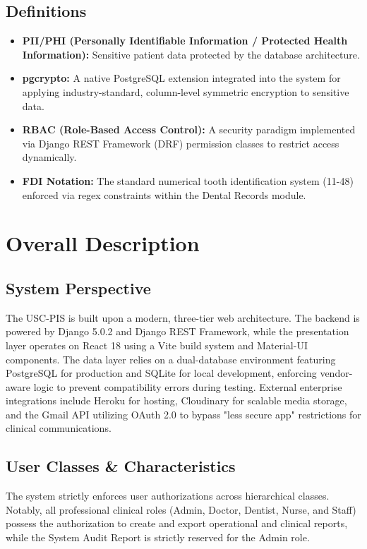 \subsection{Definitions}
\begin{itemize}
    \item \textbf{PII/PHI (Personally Identifiable Information / Protected Health Information):} Sensitive patient data protected by the database architecture.
    \item \textbf{pgcrypto:} A native PostgreSQL extension integrated into the system for applying industry-standard, column-level symmetric encryption to sensitive data.
    \item \textbf{RBAC (Role-Based Access Control):} A security paradigm implemented via Django REST Framework (DRF) permission classes to restrict access dynamically.
    \item \textbf{FDI Notation:} The standard numerical tooth identification system (11-48) enforced via regex constraints within the Dental Records module.
\end{itemize}

\section{Overall Description}

\subsection{System Perspective}
The USC-PIS is built upon a modern, three-tier web architecture. The backend is powered by Django 5.0.2 and Django REST Framework, while the presentation layer operates on React 18 using a Vite build system and Material-UI components. The data layer relies on a dual-database environment featuring PostgreSQL for production and SQLite for local development, enforcing vendor-aware logic to prevent compatibility errors during testing. External enterprise integrations include Heroku for hosting, Cloudinary for scalable media storage, and the Gmail API utilizing OAuth 2.0 to bypass "less secure app" restrictions for clinical communications.

\subsection{User Classes \& Characteristics}
The system strictly enforces user authorizations across hierarchical classes. Notably, all professional clinical roles (Admin, Doctor, Dentist, Nurse, and Staff) possess the authorization to create and export operational and clinical reports, while the System Audit Report is strictly reserved for the Admin role.

